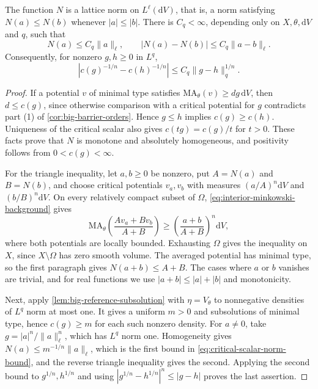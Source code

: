 \begin{proposition}\label{prop:critical-scalar-norm}
The function $N$ is a lattice norm on $L^\ell(\mathrm{d}V)$, that is, a norm satisfying $N(a)\leq N(b)$ whenever $|a|\leq|b|$. There is $C_q<\infty$, depending only on $X,\theta,\mathrm{d}V$ and $q$, such that
\begin{equation}\label{eq:critical-scalar-norm-bound}
 N(a)\leq C_q\|a\|_\ell,\qquad
 |N(a)-N(b)|\leq C_q\|a-b\|_\ell.
\end{equation}
Consequently, for nonzero $g,h\geq0$ in $L^q$,
\[
 |c(g)^{-1/n}-c(h)^{-1/n}|
       \leq C_q\|g-h\|_q^{1/n}.
\]
\end{proposition}
\begin{proof}
If a potential $v$ of minimal type satisfies $\mathrm{MA}_\theta(v)\geq d g\,\mathrm{d}V$, then $d\leq c(g)$, since otherwise comparison with a critical potential for $g$ contradicts part (1) of \cref{cor:big-barrier-orders}. Hence $g\leq h$ implies $c(g)\geq c(h)$. Uniqueness of the critical scalar also gives $c(tg)=c(g)/t$ for $t>0$. These facts prove that $N$ is monotone and absolutely homogeneous, and positivity follows from $0<c(g)<\infty$.

For the triangle inequality, let $a,b\geq0$ be nonzero, put $A=N(a)$ and $B=N(b)$, and choose critical potentials $v_a,v_b$ with measures $(a/A)^n\mathrm{d}V$ and $(b/B)^n\mathrm{d}V$. On every relatively compact subset of $\Omega$, \eqref{eq:interior-minkowski-background} gives
\[
 \mathrm{MA}_\theta\left(\frac{A v_a+B v_b}{A+B}\right)
       \geq\left(\frac{a+b}{A+B}\right)^n\mathrm{d}V,
\]
where both potentials are locally bounded. Exhausting $\Omega$ gives the inequality on $X$, since $X\setminus\Omega$ has zero smooth volume. The averaged potential has minimal type, so the first paragraph gives $N(a+b)\leq A+B$. The cases where $a$ or $b$ vanishes are trivial, and for real functions we use $|a+b|\leq|a|+|b|$ and monotonicity.

Next, apply \cref{lem:big-reference-subsolution} with $\eta=V_\theta$ to nonnegative densities of $L^q$ norm at most one. It gives a uniform $m>0$ and subsolutions of minimal type, hence $c(g)\geq m$ for each such nonzero density. For $a\ne0$, take $g=|a|^n/\|a\|_\ell^n$, which has $L^q$ norm one. Homogeneity gives $N(a)\leq m^{-1/n}\|a\|_\ell$, which is the first bound in \eqref{eq:critical-scalar-norm-bound}, and the reverse triangle inequality gives the second. Applying the second bound to $g^{1/n},h^{1/n}$ and using $|g^{1/n}-h^{1/n}|^n\leq|g-h|$ proves the last assertion.
\end{proof}

